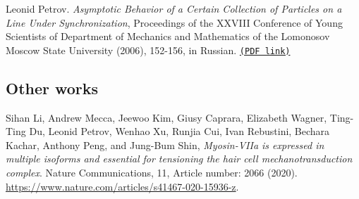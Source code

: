 \documentclass[letterpaper,11pt]{article}
\begin{document}
\begin{etaremune}
\item 
Leonid Petrov.
\emph{Asymptotic Behavior of a Certain Collection of Particles on a Line Under Synchronization}, Proceedings of the XXVIII Conference of Young Scientists of Department of Mechanics and Mathematics of the Lomonosov Moscow State University (2006), 152-156, in Russian. 
 \href{https://storage.lpetrov.cc/research_files/Petrov-publ/Asymptotic_Behavior.pdf}{\texttt{(PDF link)}}


\end{etaremune}

\subsection*{Other works}

\begin{etaremune}
	\renewcommand{\labelenumi}{[\theenumi]}
	\item
	Sihan Li, Andrew Mecca, Jeewoo Kim, Giusy Caprara, Elizabeth Wagner, Ting-Ting Du, Leonid Petrov, Wenhao Xu, Runjia Cui, Ivan Rebustini, Bechara Kachar, Anthony Peng, and Jung-Bum Shin,
	\emph{Myosin-VIIa is expressed in multiple isoforms and essential for tensioning the hair cell mechanotransduction complex}.
	Nature Communications, 11, Article number: 2066 (2020). \url{https://www.nature.com/articles/s41467-020-15936-z}.
\end{etaremune}
\end{document}
